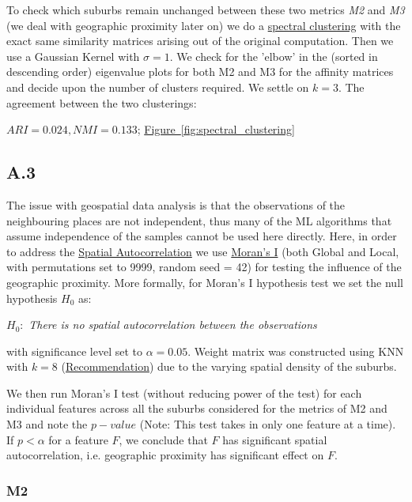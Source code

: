 \documentclass[
	a4paper, %
	10pt, %
	unnumberedsections, %
	twoside, %
]{LTJournalArticle}
\begin{document}
To check which suburbs remain unchanged between these two metrics \textit{M2} and \textit{M3} (we deal with geographic proximity later on) we do a \href{https://en.wikipedia.org/wiki/Spectral_clustering}{spectral clustering} with the exact same similarity matrices arising out of the original computation. Then we use a Gaussian Kernel with $\sigma=1$. We check for the 'elbow' in the (sorted in descending order) eigenvalue plots for both M2 and M3 for the affinity matrices and decide upon the number of clusters required. We settle on $k=3$. The agreement between the two clusterings:

$ARI=0.024, NMI=0.133$;  \hyperref[sub@fig:spectral_clustering]{Figure~\ref{fig:spectral_clustering}}


\subsection{A.3}


The issue with geospatial data analysis is that the observations of the neighbouring places are not independent, thus many of the ML algorithms that assume independence of the samples cannot be used here directly. Here, in order to address the \href{https://www.sciencedirect.com/topics/mathematics/spatial-autocorrelation}{Spatial Autocorrelation} we use \href{https://en.wikipedia.org/wiki/Moran%27s_I}{Moran's I} (both Global and Local, with permutations set to 9999, random seed = 42) for testing the influence of the geographic proximity. More formally, for Moran's I hypothesis test we set the null hypothesis $H_0$ as:

$H_0:$ \textit{There is no spatial autocorrelation between the observations}

with significance level set to $\alpha =0.05$. Weight matrix was constructed using KNN with $k=8$ (\href{https://pro.arcgis.com/en/pro-app/latest/tool-reference/spatial-statistics/spatial-autocorrelation.htm}{Recommendation}) due to the varying spatial density of the suburbs.

We then run Moran's I test (without reducing power of the test) for each individual features across all the suburbs considered for the metrics of M2 and M3 and note the $p-value$ (Note: This test takes in only one feature at a time). If $p<\alpha$ for a feature $F$, we conclude that $F$ has significant spatial autocorrelation, i.e. geographic proximity has significant effect on $F$.

\subsubsection{M2}\leavevmode
\end{document}
